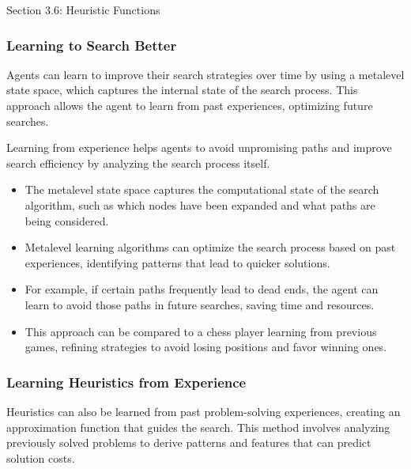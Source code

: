 \begin{notes}{Section 3.6: Heuristic Functions}
\begin{highlight}[Landmarks]
    \end{highlight}
    
    \subsubsection*{Learning to Search Better}
    
    Agents can learn to improve their search strategies over time by using a metalevel state space, which captures the internal state of the search process. This approach allows the agent to learn 
    from past experiences, optimizing future searches.
    
    \begin{highlight}
    
    Learning from experience helps agents to avoid unpromising paths and improve search efficiency by analyzing the search process itself.
    
    \begin{itemize}
        \item The metalevel state space captures the computational state of the search algorithm, such as which nodes have been expanded and what paths are being considered.
        \item Metalevel learning algorithms can optimize the search process based on past experiences, identifying patterns that lead to quicker solutions.
        \item For example, if certain paths frequently lead to dead ends, the agent can learn to avoid those paths in future searches, saving time and resources.
        \item This approach can be compared to a chess player learning from previous games, refining strategies to avoid losing positions and favor winning ones.
    \end{itemize}
    
    \end{highlight}
    
    \subsubsection*{Learning Heuristics from Experience}
    
    Heuristics can also be learned from past problem-solving experiences, creating an approximation function that guides the search. This method involves analyzing previously solved problems to derive 
    patterns and features that can predict solution costs.
    

\end{notes}
